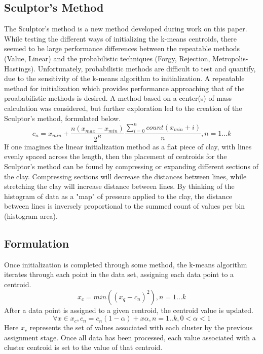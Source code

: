 \documentclass[journal]{IEEEtran}
\begin{document}
\subsection{Sculptor's Method}
The Sculptor's method is a new method developed during work on this paper. While testing the different ways of initializing the k-means centroids, there
seemed to be large performance differences between the repeatable methods (Value, Linear) and the probabilistic techniques (Forgy, Rejection, 
Metropolis-Hastings). Unfortunately, probabilistic methods are difficult to test and quantify, due to the sensitivity of the k-means algorithm to
initialization. A repeatable method for initialization which provides performance approaching that of the proababilistic methods is desired. 
A method based on a center(s) of mass calculation was considered, but further exploration led to the creation of the 
Sculptor's method, formulated below.
\begin{equation}
    c_n = x_{min} + \frac{n(x_{max}-x_{min})}{2^B}\frac{\sum_{i=0}^{n}count(x_{min}+i)}{n}, n = 1...k 
\end{equation}
If one imagines the linear initialization method as a flat piece of clay, with lines evenly spaced across the length, then the placement of
centroids for the Sculptor's method can be found by compressing or expanding different sections of the clay. Compressing sections will decrease the
distances between lines, while stretching the clay will increase distance between lines. By thinking of the histogram of data as a "map" of pressure
applied to the clay, the distance between lines is inversely proportional to the summed count of values per bin (histogram area).

\subsection{Formulation}
Once initialization is completed through some method, the k-means algorithm iterates through each point in the data set, assigning each data point to a
centroid.
\begin{equation}
    x_c = min((x_q - c_n)^2), n = 1...k
\end{equation}
After a data point is assigned to a given centroid, the centroid value is updated.
\begin{equation}
    \forall x \in {x_c}, c_n = c_n(1-\alpha) + x\alpha, n = 1..k, 0 < \alpha < 1
\end{equation}
Here $x_c$ represents the set of values associated with each cluster by the previous assignment stage.
Once all data has been processed, each value associated with a cluster centroid is set to the value of that centroid. \cite{meansWeb}
\end{document}
